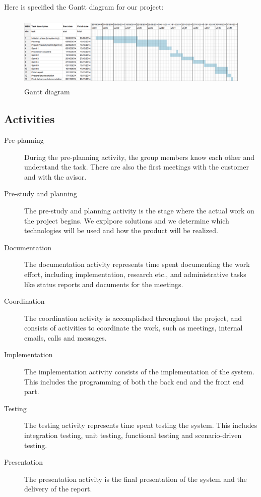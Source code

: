 \documentclass[11pt,a4paper,titlepage,oneside]{report}
\begin{document}
Here is specified the Gantt diagram for our project:
\begin{figure}[h]
\begin{center}
\includegraphics[height=130px,width=440px]{img/gantt.png}
\caption{Gantt diagram}
\label{fig:gantt}
\medskip
\small
\end{center}
\end{figure}

\subsection{Activities}
\begin{description}
\item[Pre-planning] During the pre-planning activity, the group members know each other and understand the task. There are also the first meetings with the customer and with the avisor.
\item[Pre-study and planning] The pre-study and planning activity is the stage where the actual work on the project begins. We explpore solutions and we determine which technologies will be used and how the product will be realized.
\item[Documentation] The documentation activity represents time spent documenting the work effort, including implementation, research etc., and administrative tasks like status reports and documents for the meetings.
\item[Coordination] The coordination activity is accomplished throughout the project, and consists of activities to coordinate the work, such as meetings, internal emails, calls and messages.
\item[Implementation] The implementation activity consists of the implementation of the system. This includes the programming of both the back end and the front end part.
\item[Testing] The testing activity represents time spent testing the system. This includes integration testing, unit testing, functional testing and scenario-driven testing.
\item[Presentation] The presentation activity is the final presentation of the system and the delivery of the report.
\end{description}
\end{document}
